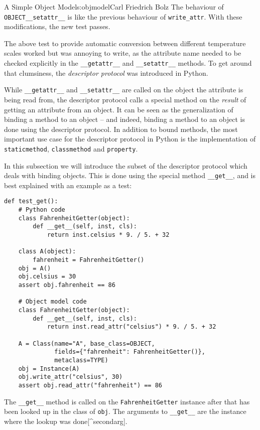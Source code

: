 \begin{aosachapter}{A Simple Object Model}{s:objmodel}{Carl Friedrich Bolz}
The behaviour of \texttt{OBJECT\_\_setattr\_\_} is like the previous
behaviour of \texttt{write\_attr}. With these modifications, the new
test passes.

\label{descriptor-protocol}

The above test to provide automatic conversion between different
temperature scales worked but was annoying to write, as the attribute
name needed to be checked explicitly in the \texttt{\_\_getattr\_\_} and
\texttt{\_\_setattr\_\_} methods. To get around that clumsiness, the
\emph{descriptor protocol} was introduced in Python.

While \texttt{\_\_getattr\_\_} and \texttt{\_\_setattr\_\_} are called
on the object the attribute is being read from, the descriptor protocol
calls a special method on the \emph{result} of getting an attribute from
an object. It can be seen as the generalization of binding a method to
an object -- and indeed, binding a method to an object is done using the
descriptor protocol. In addition to bound methods, the most important
use case for the descriptor protocol in Python is the implementation of
\texttt{staticmethod}, \texttt{classmethod} and \texttt{property}.

In this subsection we will introduce the subset of the descriptor
protocol which deals with binding objects. This is done using the
special method \texttt{\_\_get\_\_}, and is best explained with an
example as a test:

\begin{verbatim}
def test_get():
    # Python code
    class FahrenheitGetter(object):
        def __get__(self, inst, cls):
            return inst.celsius * 9. / 5. + 32

    class A(object):
        fahrenheit = FahrenheitGetter()
    obj = A()
    obj.celsius = 30
    assert obj.fahrenheit == 86

    # Object model code
    class FahrenheitGetter(object):
        def __get__(self, inst, cls):
            return inst.read_attr("celsius") * 9. / 5. + 32

    A = Class(name="A", base_class=OBJECT,
              fields={"fahrenheit": FahrenheitGetter()},
              metaclass=TYPE)
    obj = Instance(A)
    obj.write_attr("celsius", 30)
    assert obj.read_attr("fahrenheit") == 86
\end{verbatim}

The \texttt{\_\_get\_\_} method is called on the
\texttt{FahrenheitGetter} instance after that has been looked up in the
class of \texttt{obj}. The arguments to \texttt{\_\_get\_\_} are the
instance where the lookup was done{[}\^{}secondarg{]}.


\end{aosachapter}
